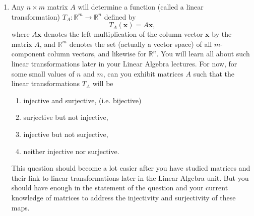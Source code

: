 \documentclass[oneside,10pt]{memoir}
\begin{document}
\begin{enumerate}
\begin{solution}
With these facts in mind we give example domains and co-domains
\begin{enumerate}
\item
injective and surjective, (i.e. bijective)
$$X = (-\pi/2, \pi/2), \quad Y=\mathbb{R},$$
\item
surjective but not injective,
$$X = (-\pi/2, \pi/2) \cup (\pi/2, 3\pi/2), \quad Y=\mathbb{R},$$
\item
injective but not surjective,
$$X=(0,\pi/2), \quad Y=\mathbb{R},$$
\item
neither injective nor surjective,
$$X=(0,\pi/2) \cup (\pi, 3\pi/2), \quad Y=\mathbb{R}.$$
\end{enumerate}

\end{solution}

\item
Any $n \times m$ matrix $A$ will determine a function (called a linear transformation) $T_A : \mathbb{R}^m \to \mathbb{R}^n$ defined by
$$T_A (\mathbf{x}) = A\mathbf{x} ,$$
where $A\mathbf{x}$ denotes the left-multiplication of the column vector $\mathbf{x}$ by the matrix $A$, and $\mathbb{R}^m$ denotes the set (actually a vector space) of all $m$-component column vectors, and likewise for $\mathbb{R}^n$. You will learn all about such linear transformations later in your Linear Algebra lectures. For now, for some small values of $n$ and $m$, can you exhibit matrices $A$ such that the linear transformations $T_A$ will be

\begin{enumerate}
\item
injective and surjective, (i.e. bijective)
\item
surjective but not injective,
\item
injective but not surjective,
\item
neither injective nor surjective.
\end{enumerate}
\begin{solution}
This question should become a lot easier after you have studied matrices and their link to linear transformations later in the Linear Algebra unit. But you should have enough in the statement of the question and your current knowledge of matrices to address the injectivity and surjectivity of these maps.


\end{solution}
\end{enumerate}
\end{document}
